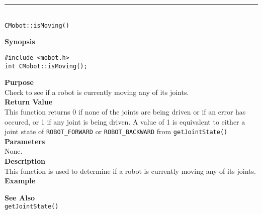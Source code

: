 \noindent
\vspace{5pt}
\rule{4.5in}{0.015in}\\
\noindent
{\LARGE \texttt{CMobot::isMoving()}}\\
{}

\noindent
{\bf Synopsis}
\vspace{-8pt}
\begin{verbatim}
#include <mobot.h>
int CMobot::isMoving();
\end{verbatim}

\noindent
{\bf Purpose}\\
Check to see if a robot is currently moving any of its joints.\\

\noindent
{\bf Return Value}\\
This function returns 0 if none of the joints are being driven or if an error
has occured, or 1 if any joint is being driven. A value of 1 is equivalent to 
either a joint state of \texttt{ROBOT\_FORWARD} or \texttt{ROBOT\_BACKWARD} 
from \texttt{getJointState()}\\ 

\noindent
{\bf Parameters}\\
None.\\

\noindent
{\bf Description}\\
This function is used to determine if a robot is currently moving any of
its joints. \\

\noindent
{\bf Example}\\
\noindent

\noindent
{\bf See Also}\\
\texttt{getJointState()}


